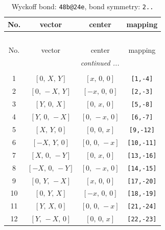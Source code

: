 \documentclass[fleqn,8pt]{jsarticle}
\begin{document}
\renewcommand{\arraystretch}{1.2}
\begin{longtable}{cccc}
\caption{Wyckoff bond: {\tt 48b@24e}, bond symmetry: {\tt 2..}}
 \\
 \hline \hline
No. & vector & center & mapping \\ \hline \endfirsthead

\multicolumn{3}{l}{\tablename\ \thetable{}} \\
 \hline \hline
No. & vector & center & mapping \\ \hline \endhead

 \hline \hline
\multicolumn{3}{r}{\footnotesize\it continued ...} \\ \endfoot

 \hline \hline
\multicolumn{3}{r}{} \\ \endlastfoot

1 & $\left[ 0,\, X,\, Y \right]$ & $\left[ x,\, 0,\, 0 \right]$ & {\tt [1,-4]} \\ \hline
2 & $\left[ 0,\, - X,\, Y \right]$ & $\left[ - x,\, 0,\, 0 \right]$ & {\tt [2,-3]} \\ \hline
3 & $\left[ Y,\, 0,\, X \right]$ & $\left[ 0,\, x,\, 0 \right]$ & {\tt [5,-8]} \\ \hline
4 & $\left[ Y,\, 0,\, - X \right]$ & $\left[ 0,\, - x,\, 0 \right]$ & {\tt [6,-7]} \\ \hline
5 & $\left[ X,\, Y,\, 0 \right]$ & $\left[ 0,\, 0,\, x \right]$ & {\tt [9,-12]} \\ \hline
6 & $\left[ - X,\, Y,\, 0 \right]$ & $\left[ 0,\, 0,\, - x \right]$ & {\tt [10,-11]} \\ \hline
7 & $\left[ X,\, 0,\, - Y \right]$ & $\left[ 0,\, x,\, 0 \right]$ & {\tt [13,-16]} \\ \hline
8 & $\left[ - X,\, 0,\, - Y \right]$ & $\left[ 0,\, - x,\, 0 \right]$ & {\tt [14,-15]} \\ \hline
9 & $\left[ 0,\, Y,\, - X \right]$ & $\left[ x,\, 0,\, 0 \right]$ & {\tt [17,-20]} \\ \hline
10 & $\left[ 0,\, Y,\, X \right]$ & $\left[ - x,\, 0,\, 0 \right]$ & {\tt [18,-19]} \\ \hline
11 & $\left[ Y,\, X,\, 0 \right]$ & $\left[ 0,\, 0,\, - x \right]$ & {\tt [21,-24]} \\ \hline
12 & $\left[ Y,\, - X,\, 0 \right]$ & $\left[ 0,\, 0,\, x \right]$ & {\tt [22,-23]} \\
\end{longtable}
\renewcommand{\arraystretch}{1.2}
\end{document}
